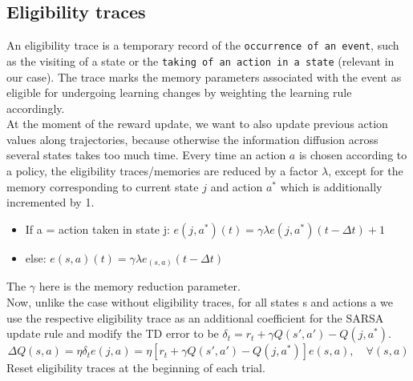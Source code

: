 \documentclass[11pt]{article}
\begin{document}
\subsection{Eligibility traces}
An eligibility trace is a temporary record of the \texttt{occurrence of an event}, such as the visiting of a state or the \texttt{taking of an action in a state} (relevant in our case). The trace marks the memory parameters associated with the event as eligible for undergoing learning changes by weighting the learning rule accordingly.\\ 
At the moment of the reward update, we want to also update previous action values along trajectories, because otherwise the information diffusion across several states takes too much time.
Every time an action $a$ is chosen according to a policy, the eligibility traces/memories are reduced by a factor $\lambda$, except for the memory corresponding to current state $j$ and action $a^*$ which is additionally incremented by 1.
\begin{itemize}
	\item If a = action taken in state j: $e(j,a^*)(t) = \gamma\lambda e(j,a^*)(t-\Delta t) + 1$
	\item else: $e(s,a)(t) = \gamma \lambda e_(s,a)(t-\Delta t)$ 
\end{itemize}
The $\gamma$ here is the memory reduction parameter.\\
Now, unlike the case without eligibility traces, for all states s and actions a we use the respective eligibility trace as an additional coefficient for the SARSA update rule and modify the TD error to be $\delta_t=r_t+\gamma Q(s',a')-Q(j,a^*)$.
\[
	\Delta Q(s,a) = \eta \delta_t e(j,a)= \eta \left[r_t+\gamma Q(s',a')-Q(j,a^*)\right]e(s,a),\quad \forall(s,a)
\]
Reset eligibility traces at the beginning of each trial.
\end{document}
